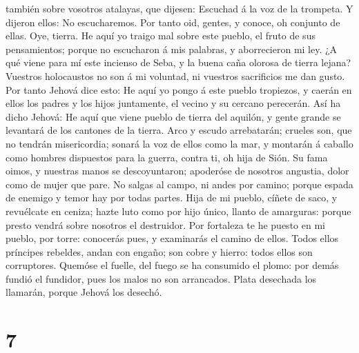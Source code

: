 también sobre vosotros atalayas, que dijesen: Escuchad á la voz de la
trompeta. Y dijeron ellos: No escucharemos.  Por tanto
oid, gentes, y conoce, oh conjunto de ellas.  Oye,
tierra. He aquí yo traigo mal sobre este pueblo, el fruto de sus
pensamientos; porque no escucharon á mis palabras, y aborrecieron mi
ley.  ¿A qué viene para mí este incienso de Seba, y la
buena caña olorosa de tierra lejana? Vuestros holocaustos no son á mi
voluntad, ni vuestros sacrificios me dan gusto.  Por
tanto Jehová dice esto: He aquí yo pongo á este pueblo tropiezos, y
caerán en ellos los padres y los hijos juntamente, el vecino y su
cercano perecerán.  Así ha dicho Jehová: He aquí que
viene pueblo de tierra del aquilón, y gente grande se levantará de los
cantones de la tierra.  Arco y escudo arrebatarán;
crueles son, que no tendrán misericordia; sonará la voz de ellos como la
mar, y montarán á caballo como hombres dispuestos para la guerra, contra
ti, oh hija de Sión.  Su fama oimos, y nuestras manos se
descoyuntaron; apoderóse de nosotros angustia, dolor como de mujer que
pare.  No salgas al campo, ni andes por camino; porque
espada de enemigo y temor hay por todas partes.  Hija de
mi pueblo, cíñete de saco, y revuélcate en ceniza; hazte luto como por
hijo único, llanto de amarguras: porque presto vendrá sobre nosotros el
destruidor.  Por fortaleza te he puesto en mi pueblo, por
torre: conocerás pues, y examinarás el camino de ellos. 
Todos ellos príncipes rebeldes, andan con engaño; son cobre y hierro:
todos ellos son corruptores.  Quemóse el fuelle, del
fuego se ha consumido el plomo: por demás fundió el fundidor, pues los
malos no son arrancados.  Plata desechada los llamarán,
porque Jehová los desechó.

\hypertarget{section-6}{%
\section{7}\label{section-6}}

